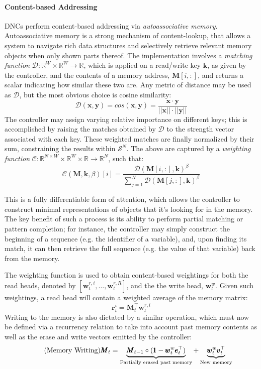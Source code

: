 \documentclass[]{article}
\begin{document}
\paragraph{Content-based Addressing} 
DNCs perform content-based addressing via \textit{autoassociative memory}\cite[Chapter~12]{rojas}. Autoassociative memory is a strong mechanism of content-lookup, that allows a system to navigate rich data structures and selectively retrieve relevant memory objects when only shown parts thereof. The implementation involves a \textit{matching function} $\mathcal{D}: \mathbb{R}^W \times \mathbb{R}^W \to \mathbb{R}$, which is applied on a read/write key $\pmb{k}$, as given by the controller, and the contents of a memory address, $\pmb{M}[i,:]$, and returns a scalar indicating how similar these two are. Any metric of distance may be used as $\mathcal{D}$, but the most obvious choice is cosine similarity:
 \[
 \tag{Cosine Similarity} \label{eqn:Cosine}
\mathcal{D}(\pmb{x}, \pmb{y}) = cos(\pmb{x},\pmb{y}) = \frac{\pmb{x} \cdot \pmb{y}}{||\pmb{x}|| \cdot ||\pmb{y}||}
\]
The controller may assign varying relative importance on different keys; this is accomplished by raising the matches obtained by $\mathcal{D}$ to the strength vector associated with each key. These weighted matches are finally normalized by their sum, constraining the results within $\mathcal{S}^N$. The above are captured by a \textit{weighting function} $\mathcal{C}: \mathbb{R}^{N \times W} \times \mathbb{R}^W \times \mathbb{R} \to \mathbb{R}^N$, such that:
\[
\tag{Weighting Function}
\mathcal{C}(\pmb{M},\pmb{k}, \beta)[i] = 
\frac{ \mathcal{D}(\pmb{M}[i,:],\pmb{k})^{\beta} }
{\sum\nolimits_{j=1}^N \mathcal{D}(\pmb{M}[j,:],\pmb{k})^{\beta}}
\]

This is a fully differentiable form of attention, which allows the controller to construct minimal representations of objects that it's looking for in the memory. The key benefit of such a process is its ability to perform partial matching or pattern completion; for instance, the controller may simply construct the beginning of a sequence (e.g. the identifier of a variable), and, upon finding its match, it can then retrieve the full sequence (e.g. the  value of that variable) back from the memory.

The weighting function is used to obtain content-based weightings for both the read heads, denoted by $[\pmb{w}_t^{r,i},\dots,\pmb{w}_t^{r,R}]$, and the the write head, $\pmb{w}_t^w$. Given such weightings, a read head will contain a weighted average of the memory matrix:
\[
\tag{Memory Reading}
\pmb{r}_t^i = \pmb{M}_t^{\top} \pmb{w}_t^{r,i} 
\]
Writing to the memory is also dictated by a similar operation, which must now be defined via a recurrency relation to take into account past memory contents as well as the erase and write vectors emitted by the controller:
\[
\tag{Memory Writing}
\pmb{M}_t = \underbrace{\pmb{M}_{t-1} \circ (\pmb{1} - \pmb{w}_t^w \pmb{e}_t^\top)}_{\text{\scriptsize Partially erased past memory}} + \underbrace{\pmb{w}_t^w \pmb{v}_t^\top}_{\text{\scriptsize New memory}}
\]
\end{document}
